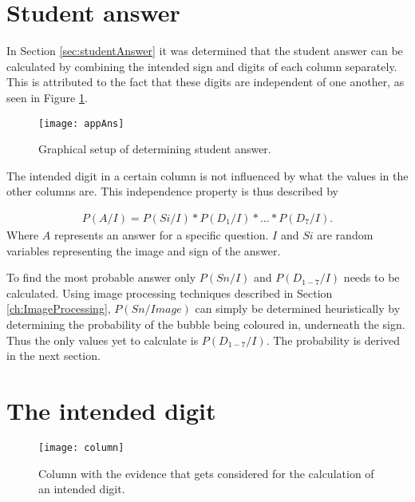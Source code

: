 \section{Student answer}

In Section \ref{sec:studentAnswer} it was determined that the student answer can be calculated by combining the intended sign and digits of each column separately. This is attributed to the fact that these digits are independent of one another, as seen in Figure \ref{fig:appAns}. 

\begin{figure}
  \centering
  \texttt{[image: appAns]}\\
  \caption{Graphical setup of determining student answer.}
  \label{fig:appAns}
\end{figure}

The intended digit in a certain column is not influenced by what the values in the other columns are. This independence property is thus described by

\begin{align}
  P(A/I) =  P(Si/I)*P(D_1/I)*...*P(D_7/I).
\label{eqn:ansIndep}
\end{align}
Where $A$ represents an answer for a specific question. $I$ and $Si$ are random variables representing the image and sign of the answer.

To find the most probable answer only $P(Sn/I)$ and $P(D_{1-7}/I)$ needs to be calculated. Using image processing techniques described in Section \ref{ch:ImageProcessing}, $P(Sn/Image)$ can simply be determined heuristically by determining the probability of the bubble being coloured in, underneath the sign. Thus the only values yet to calculate is $P(D_{1-7}/I)$. The probability is derived in the next section.

\section{The intended digit}

\begin{figure}
  \centering
  \texttt{[image: column]}\\
  \caption{Column with the evidence that gets considered for the calculation of an intended digit.}
  \label{fig:column}
\end{figure}

